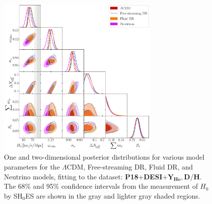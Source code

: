 \documentclass[aps,prd,twocolumn,notitlepage,
superscriptaddress,
nofootinbib,floatfix]{revtex4-2}
\newcommand{\planck}{\textbf{P18}}
\newcommand{\desi}{$\mathbf{+}$\textbf{DESI}}
\newcommand{\bbnlike}{$\mathbf{+ Y_\text{He}, D/H}$}
\begin{document}
\begin{widetext}
\begin{figure}[H]
\centering
    \includegraphics[width=0.7\textwidth]{figures_21_4/all_DB.pdf}
    \caption{One and two-dimensional posterior distributions for various model parameters for the $\Lambda$CDM, Free-streaming DR, Fluid DR, and Neutrino models, fitting to the dataset: \planck\desi\bbnlike. The 68\% and 95\% confidence intervals from the measurement of $H_0$ by SH$_0$ES are shown in the gray and lighter gray shaded regions.}
\end{figure}


\end{widetext}
\end{document}

